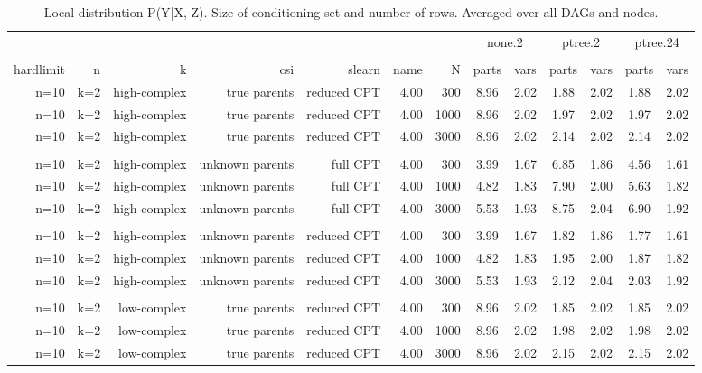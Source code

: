 \begin{table}[ht]
\centering
\caption{Local distribution P(Y|X, Z). Size of conditioning set and number of rows. Averaged over all DAGs and nodes.} 
\begin{tabular}{rrrrrrr|cc|cc|cc}
  \toprule
   & & & & & & &\multicolumn{2}{c}{none.2}&\multicolumn{2}{c}{ptree.2}&\multicolumn{2}{c}{ptree.24}   \\ 
 \cline{8-13}  \\ 
 hardlimit & n & k & csi & slearn & name & N & parts & vars & parts & vars & parts & vars  \\ 
 \midrule
n=10 & k=2 & high-complex & true parents & reduced CPT & 4.00 & 300 & 8.96 & 2.02 & 1.88 & 2.02 & 1.88 & 2.02 \\ 
  n=10 & k=2 & high-complex & true parents & reduced CPT & 4.00 & 1000 & 8.96 & 2.02 & 1.97 & 2.02 & 1.97 & 2.02 \\ 
  n=10 & k=2 & high-complex & true parents & reduced CPT & 4.00 & 3000 & 8.96 & 2.02 & 2.14 & 2.02 & 2.14 & 2.02 \\ 
   \\ 
n=10 & k=2 & high-complex & unknown parents & full CPT & 4.00 & 300 & 3.99 & 1.67 & 6.85 & 1.86 & 4.56 & 1.61 \\ 
  n=10 & k=2 & high-complex & unknown parents & full CPT & 4.00 & 1000 & 4.82 & 1.83 & 7.90 & 2.00 & 5.63 & 1.82 \\ 
  n=10 & k=2 & high-complex & unknown parents & full CPT & 4.00 & 3000 & 5.53 & 1.93 & 8.75 & 2.04 & 6.90 & 1.92 \\ 
   \\ 
n=10 & k=2 & high-complex & unknown parents & reduced CPT & 4.00 & 300 & 3.99 & 1.67 & 1.82 & 1.86 & 1.77 & 1.61 \\ 
  n=10 & k=2 & high-complex & unknown parents & reduced CPT & 4.00 & 1000 & 4.82 & 1.83 & 1.95 & 2.00 & 1.87 & 1.82 \\ 
  n=10 & k=2 & high-complex & unknown parents & reduced CPT & 4.00 & 3000 & 5.53 & 1.93 & 2.12 & 2.04 & 2.03 & 1.92 \\ 
   \\ 
n=10 & k=2 & low-complex & true parents & reduced CPT & 4.00 & 300 & 8.96 & 2.02 & 1.85 & 2.02 & 1.85 & 2.02 \\ 
  n=10 & k=2 & low-complex & true parents & reduced CPT & 4.00 & 1000 & 8.96 & 2.02 & 1.98 & 2.02 & 1.98 & 2.02 \\ 
  n=10 & k=2 & low-complex & true parents & reduced CPT & 4.00 & 3000 & 8.96 & 2.02 & 2.15 & 2.02 & 2.15 & 2.02 \\ 

\end{tabular}
\end{table}
